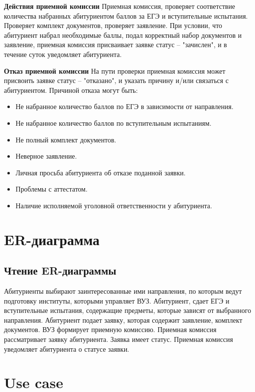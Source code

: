 \documentclass[areasetadvanced]{scrartcl}
\begin{document}
\textbf{Действия приемной комиссии}
Приемная комиссия, проверяет соответствие количества набранных абитуриентом баллов за
ЕГЭ и вступительные испытания. Проверяет комплект документов, проверяет заявление.
При условии, что абитуриент набрал необходимые баллы, подал корректный набор
документов и заявление, приемная комиссия присваивает заявке статус –
"зачислен", и в течение суток уведомляет абитуриента.

\textbf{Отказ приемной комиссии}
На пути проверки приемная комиссия может присвоить заявке статус –
"отказано", и указать причину и/или связаться с абитуриентом. Причиной отказа могут быть:
\begin{itemize}
    \item Не набранное количество баллов по ЕГЭ в зависимости от направления.
    \item Не набранное количество баллов по вступительным испытаниям.
    \item Не полный комплект документов.
    \item Неверное заявление.
    \item Личная просьба абитуриента об отказе поданной заявки.
    \item Проблемы с аттестатом.
    \item Наличие исполняемой уголовной ответственности у абитуриента.
\end{itemize}
\newpage
\section{ER-диаграмма}
\subsection{Чтение ER-диаграммы}

Абитуриенты выбирают заинтересованные ими направления, по которым ведут
подготовку институты, которыми управляет ВУЗ. Абитуриент, сдает ЕГЭ и вступительные
испытания, содержащие предметы, которые зависят от выбранного направления. Абитуриент
подает заявку, которая содержит заявление, комплект документов. ВУЗ формирует
приемную комиссию. Приемная комиссия рассматривает заявку абитуриента. Заявка имеет
статус. Приемная комиссия уведомляет абитуриента о статусе заявки.



\newpage
\section{Use case}
\end{document}
